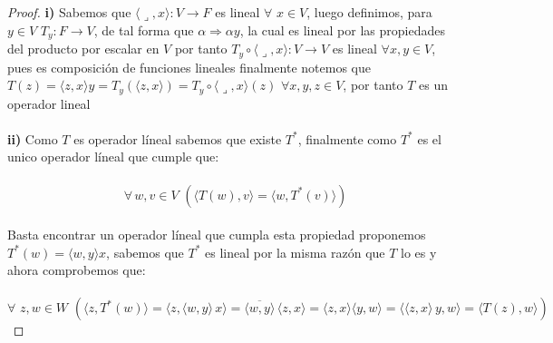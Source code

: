 \documentclass[11pt,letterpaper]{article}
\begin{document}
\begin{proof}
   \textbf{i)}\,\,Sabemos que $\langle \lrcorner ,x\rangle:V\rightarrow F$ es lineal $\forall\,\,x\in V$, luego definimos, para $y\in V$ $T_{y}:F\rightarrow V$, de tal forma que
    $\alpha \Rightarrow \alpha y$, la cual es lineal por las propiedades del producto por escalar en $V$ por tanto $T_y\circ \langle \lrcorner ,x \rangle:V\rightarrow V$ es lineal $\forall x,y\in V$, pues es 
    composici\'on de funciones lineales finalmente notemos que $T(z)=\langle z,x \rangle y=T_y(\langle z,x \rangle)=T_y\circ \langle \lrcorner ,x \rangle(z)\,\,\forall x,y,z\in V $, por tanto $T$ es un operador lineal \,\\
    \,\\
    \textbf{ii)}\,\,Como $T$ es operador l\'ineal sabemos que existe $T^*$, finalmente como $T^*$ es el unico operador l\'ineal que cumple que:\,\\
    \,\\
    \begin{equation*}
        \forall\,w,v\in V\,\,(\langle T(w),v \rangle=\langle w, T^*(v) \rangle)
    \end{equation*}\,\\
    Basta encontrar un operador l\'ineal que cumpla esta propiedad proponemos $T^{*}(w)=\langle w,y \rangle x$, sabemos que $T^{*}$ es lineal por la misma raz\'on que $T$ lo es y ahora comprobemos que:\,\\
    \,\\
    \begin{equation*}
        \forall\,\,z,w\in W\,\,(\langle z,T^*(w)\rangle=\langle z, \langle w,y \rangle\,x \rangle=\overline{\langle w,y \rangle}\,\langle z,x \rangle=\langle z,x \rangle \langle y,w \rangle=\langle\langle z,x \rangle\,y,w \rangle=\langle T(z),w\rangle)
    \end{equation*}
\end{proof}\,\\
\newpage
{}
\end{document}
